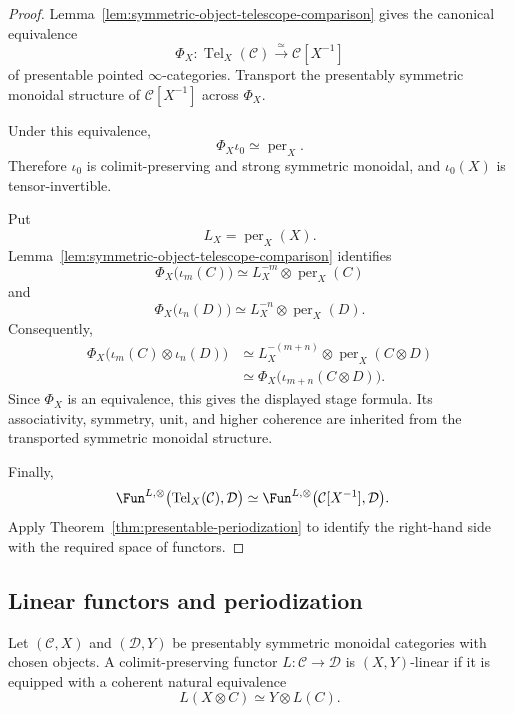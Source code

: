 \begin{proof}
Lemma~\ref{lem:symmetric-object-telescope-comparison} gives the canonical
equivalence
\[
    \Phi_X:
    \operatorname{Tel}_X(\mathcal C)
    \xrightarrow{\simeq}
    \mathcal C[X^{-1}]
\]
of presentable pointed \(\infty\)-categories.  Transport the presentably
symmetric monoidal structure of \(\mathcal C[X^{-1}]\) across
\(\Phi_X\).

Under this equivalence,
\[
    \Phi_X\iota_0
    \simeq
    \operatorname{per}_X.
\]
Therefore \(\iota_0\) is colimit-preserving and strong symmetric monoidal,
and \(\iota_0(X)\) is tensor-invertible.

Put
\[
    L_X=\operatorname{per}_X(X).
\]
Lemma~\ref{lem:symmetric-object-telescope-comparison} identifies
\[
    \Phi_X\bigl(\iota_m(C)\bigr)
    \simeq
    L_X^{-m}\otimes\operatorname{per}_X(C)
\]
and
\[
    \Phi_X\bigl(\iota_n(D)\bigr)
    \simeq
    L_X^{-n}\otimes\operatorname{per}_X(D).
\]
Consequently,
\[
\begin{aligned}
    \Phi_X
    \bigl(
      \iota_m(C)\otimes\iota_n(D)
    \bigr)
    &\simeq
    L_X^{-(m+n)}
    \otimes
    \operatorname{per}_X(C\otimes D) \\
    &\simeq
    \Phi_X
    \bigl(
      \iota_{m+n}(C\otimes D)
    \bigr).
\end{aligned}
\]
Since \(\Phi_X\) is an equivalence, this gives the displayed stage formula.
Its associativity, symmetry, unit, and higher coherence are inherited from
the transported symmetric monoidal structure.

Finally,
\[
\begin{aligned}
    \Fun^{L,\otimes}
    \bigl(
      \operatorname{Tel}_X(\mathcal C),
      \mathcal D
    \bigr)
    &\simeq
    \Fun^{L,\otimes}
    \bigl(
      \mathcal C[X^{-1}],
      \mathcal D
    \bigr).
\end{aligned}
\]
Apply Theorem~\ref{thm:presentable-periodization} to identify the right-hand
side with the required space of functors.
\end{proof}

\subsection{Linear functors and periodization}

\begin{definition}
\label{def:XY-linear}
Let $(\mathcal C,X)$ and $(\mathcal D,Y)$ be presentably symmetric monoidal categories with chosen
objects.  A colimit-preserving functor $L:\mathcal C\to\mathcal D$ is $(X,Y)$-linear if it is equipped
with a coherent natural equivalence
\[
    L(X\otimes C)
    \simeq
    Y\otimes L(C).
\]
\end{definition}

